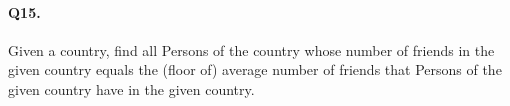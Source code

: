 \paragraph{Q15.}
Given a country, find all Persons of the country whose number of friends
in the given country equals the (floor of) average number of friends
that Persons of the given country have in the given country.
